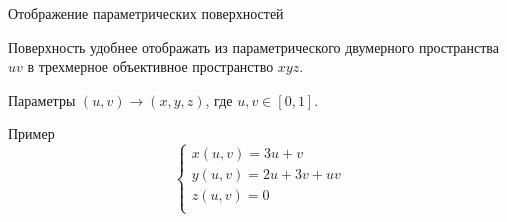 \documentclass{beamer}
\begin{document}
	\begin{frame}{Отображение параметрических поверхностей}

		Поверхность удобнее отображать из параметрического двумерного пространства $uv$ в трехмерное объективное пространство $xyz$.

		Параметры $(u,v) \to (x,y,z)$, где $u,v \in [0,1]$.

		Пример
		\[
		\begin{cases}
			x(u,v) = 3u +v \\
			y(u,v) = 2u +3v +uv \\
			z(u,v) = 0 \\
		\end{cases}	
		\]


	\end{frame}
\end{document}
